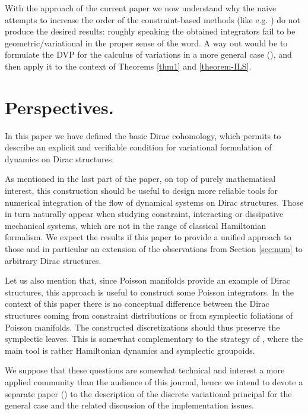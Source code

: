 \documentclass[a4paper,12pt]{amsart}
\theoremstyle{definition}
\begin{document}
{With the approach of the current paper we now understand why the naive attempts to increase the order of the constraint-based methods (like e.g. \cite{leok}) do not produce the desired results: roughly speaking the obtained integrators fail to be geometric/variational in the proper sense of the word. A way out would be to formulate the DVP for the calculus of variations in a more general case (\cite{Pontryagin}), and then apply it to the context of Theorems \ref{thm1} and \ref{theorem-ILS}.}

\section*{Perspectives.}

In this paper we have defined the basic Dirac cohomology, which permits {to describe an explicit and verifiable condition for} variational formulation of dynamics on Dirac structures. 

As mentioned in the last part of the paper, on top of purely mathematical interest, this construction should be useful to design more reliable tools for numerical integration of the flow of dynamical systems on Dirac structures. Those in turn naturally appear when studying constraint, interacting or dissipative mechanical systems, which are not in the range of classical Hamiltonian formalism. 
{We expect the results if this paper to provide a unified approach to those and in particular an extension of the observations from Section \ref{sec:num} to arbitrary Dirac structures.} 


Let us also mention that, since Poisson manifolds provide an example of Dirac structures, this approach is useful to construct some Poisson integrators. {In the context of this paper there is no conceptual difference between the Dirac structures coming from constraint distributions or from symplectic foliations of Poisson manifolds. The constructed discretizations should thus preserve the symplectic leaves. %
}
This is somewhat complementary to the strategy of \cite{oscar}, where the main tool is rather Hamiltonian dynamics and symplectic groupoids. 

We suppose that these questions {are somewhat technical} and interest a more applied community than the audience of this journal, hence we intend to devote a separate paper {(\cite{discr-pont}) to the description of the discrete variational principal for the general case and the related discussion of the implementation issues.}\\
\end{document}
